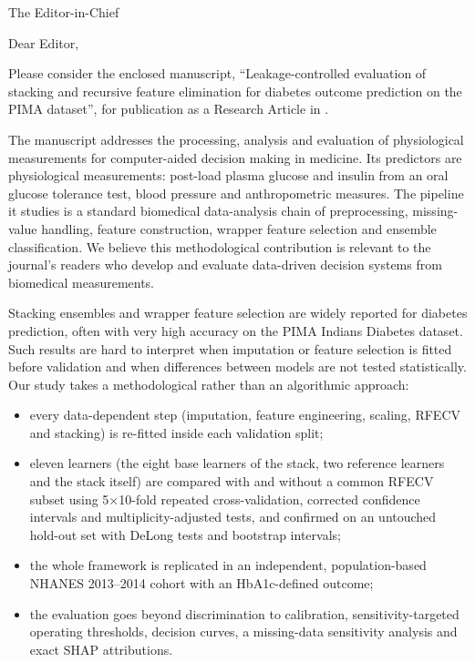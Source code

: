 \documentclass[11pt]{letter}
\begin{document}
\begin{letter}{The Editor-in-Chief\\\targetjournal}
\opening{Dear Editor,}

Please consider the enclosed manuscript, ``Leakage-controlled evaluation of stacking and recursive feature elimination for diabetes outcome prediction on the PIMA dataset'', for publication as a Research Article in \emph{\targetjournal}.

The manuscript addresses the processing, analysis and evaluation of physiological measurements for computer-aided decision making in medicine. Its predictors are physiological measurements: post-load plasma glucose and insulin from an oral glucose tolerance test, blood pressure and anthropometric measures. The pipeline it studies is a standard biomedical data-analysis chain of preprocessing, missing-value handling, feature construction, wrapper feature selection and ensemble classification. We believe this methodological contribution is relevant to the journal's readers who develop and evaluate data-driven decision systems from biomedical measurements.

Stacking ensembles and wrapper feature selection are widely reported for diabetes prediction, often with very high accuracy on the PIMA Indians Diabetes dataset. Such results are hard to interpret when imputation or feature selection is fitted before validation and when differences between models are not tested statistically. Our study takes a methodological rather than an algorithmic approach:

\begin{itemize}
  \item every data-dependent step (imputation, feature engineering, scaling, RFECV and stacking) is re-fitted inside each validation split;
  \item eleven learners (the eight base learners of the stack, two reference learners and the stack itself) are compared with and without a common RFECV subset using 5$\times$10-fold repeated cross-validation, corrected confidence intervals and multiplicity-adjusted tests, and confirmed on an untouched hold-out set with DeLong tests and bootstrap intervals;
  \item the whole framework is replicated in an independent, population-based NHANES 2013--2014 cohort with an HbA1c-defined outcome;
  \item the evaluation goes beyond discrimination to calibration, sensitivity-targeted operating thresholds, decision curves, a missing-data sensitivity analysis and exact SHAP attributions.
\end{itemize}


\end{letter}
\end{document}
